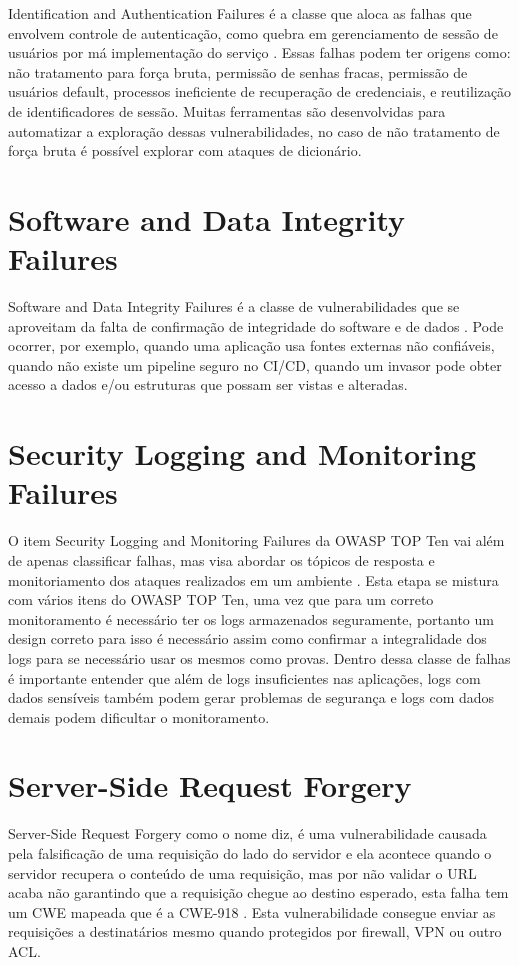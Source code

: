 Identification and Authentication Failures é a classe que aloca as falhas que envolvem controle de autenticação, como quebra em gerenciamento de sessão de usuários por má implementação do serviço \cite{authentication}. Essas falhas podem ter origens como: não tratamento para força bruta, permissão de senhas fracas, permissão de usuários default, processos ineficiente de recuperação de credenciais, e reutilização de identificadores de sessão. Muitas ferramentas são desenvolvidas para automatizar a exploração dessas vulnerabilidades, no caso de não tratamento de força bruta é possível explorar com ataques de dicionário.

\section{Software and Data Integrity Failures}

Software and Data Integrity Failures é a classe de vulnerabilidades que se aproveitam da falta de confirmação de integridade do software e de dados \cite{integrity}. Pode ocorrer, por exemplo, quando uma aplicação usa fontes externas não confiáveis, quando não existe um pipeline seguro no CI/CD, quando um invasor pode obter acesso a dados e/ou estruturas que possam ser vistas e alteradas. 

\section{Security Logging and Monitoring Failures}

O item Security Logging and Monitoring Failures da OWASP TOP Ten vai além de apenas classificar falhas, mas visa abordar os tópicos de resposta e monitoriamento dos ataques realizados em um ambiente \cite{logging}. Esta etapa se mistura com vários itens do OWASP TOP Ten, uma vez que para um correto monitoramento é necessário ter os logs armazenados seguramente, portanto um design correto para isso é necessário assim como confirmar a integralidade dos logs para se necessário usar os mesmos como provas. Dentro dessa classe de falhas é importante entender que além de logs insuficientes nas aplicações, logs com dados sensíveis também podem gerar problemas de segurança e logs com dados demais podem dificultar o monitoramento.

\section{Server-Side Request Forgery}

Server-Side Request Forgery como o nome diz, é uma vulnerabilidade causada pela falsificação de uma requisição do lado do servidor e ela acontece quando o servidor recupera o conteúdo de uma requisição, mas por não validar o URL acaba não garantindo que a requisição chegue ao destino esperado, esta falha tem um CWE mapeada que é a CWE-918 \cite{jabiyev2021preventing}. Esta vulnerabilidade consegue enviar as requisições a destinatários mesmo quando protegidos por firewall, VPN ou outro ACL.